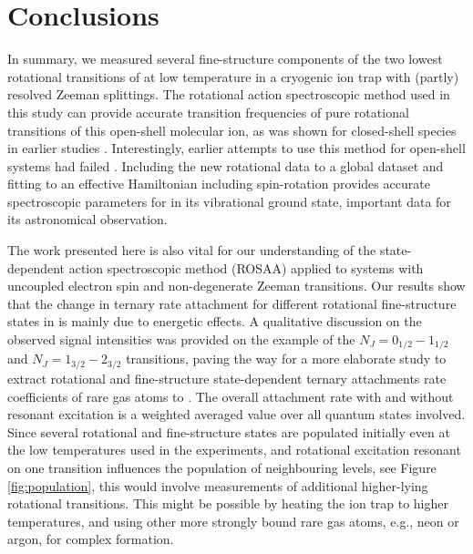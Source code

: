 
%        


\section{Conclusions}

In summary, we measured several fine-structure components of the two lowest rotational transitions of \co at low temperature in a cryogenic ion trap with (partly) resolved Zeeman splittings. The rotational action spectroscopic method used in this study can provide accurate transition frequencies of pure rotational transitions of this open-shell molecular ion,  as was shown for closed-shell species in earlier studies \cite{brunken_laboratory_2014, domenech2017, thorwirth_pure_2019, asvany_fundamental_2021}. Interestingly, earlier attempts to use this method for open-shell systems had failed \cite{kohguchi_high-resolution_2018, AMS2020}. Including the new rotational data to a global dataset and fitting to an effective Hamiltonian including spin-rotation provides accurate spectroscopic parameters for \co in its vibrational ground state, important data for its astronomical observation.

The work presented here is also vital for our understanding of the state-dependent action spectroscopic method (ROSAA) applied to systems with uncoupled electron spin and non-degenerate Zeeman transitions. Our results show that the change in ternary rate attachment for different rotational fine-structure states in \co is mainly due to energetic effects. A qualitative discussion on the observed signal intensities was provided on the example of the $N_J=0_{1/2}-1_{1/2}$ and $N_J=1_{3/2}-2_{3/2}$ transitions, paving the way for a more elaborate study to extract rotational and fine-structure state-dependent ternary attachments rate coefficients of rare gas atoms to \con. The overall attachment rate with and without resonant excitation is a weighted averaged value over all quantum states involved. Since several rotational and fine-structure states are populated initially even at the low temperatures used in the experiments, and rotational excitation resonant on one transition influences the population of neighbouring levels, see Figure \ref{fig:population}, this would involve measurements of additional higher-lying rotational transitions. This might be possible by heating the ion trap to higher temperatures, and using other more strongly bound rare gas atoms, e.g., neon or argon, for complex formation. \\



